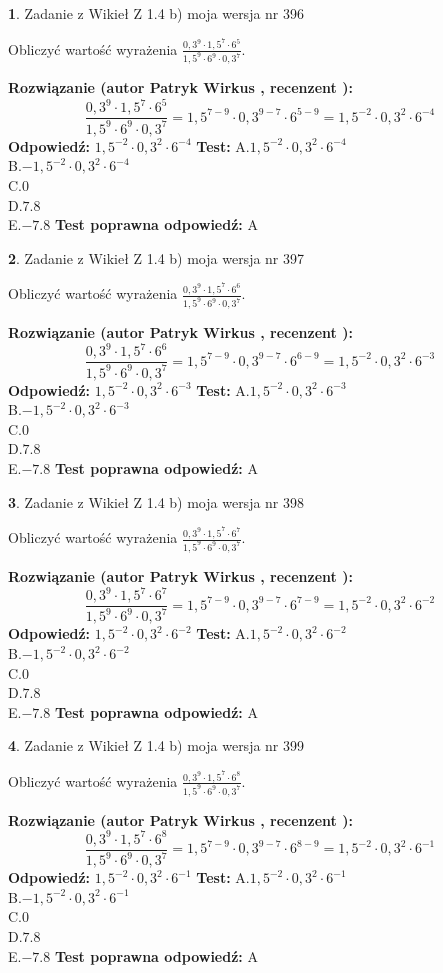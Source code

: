 \documentclass[12pt, a4paper]{article}
\theoremstyle{definition} %
\newtheorem{zad}{}
\newcommand{\zadStart}[1]{\begin{zad}#1\newline}
\newcommand{\zadStop}{\end{zad}}
\newcommand{\rozwStart}[2]{\noindent \textbf{Rozwiązanie (autor #1 , recenzent #2): }\newline}
\newcommand{\rozwStop}{\newline}
\newcommand{\odpStart}{\noindent \textbf{Odpowiedź:}\newline}
\newcommand{\odpStop}{\newline}
\newcommand{\testStart}{\noindent \textbf{Test:}\newline}
\newcommand{\testStop}{\newline}
\newcommand{\kluczStart}{\noindent \textbf{Test poprawna odpowiedź:}\newline}
\newcommand{\kluczStop}{\newline}
\begin{document}
\zadStart{Zadanie z Wikieł Z 1.4 b) moja wersja nr 396}

Obliczyć wartość wyrażenia $\frac{0,3^{9}\cdot1,5^{7}\cdot6^{5}}{1,5^{9}\cdot6^{9}\cdot0,3^{7}}$.
\zadStop
\rozwStart{Patryk Wirkus}{}
$$\frac{0,3^{9}\cdot1,5^{7}\cdot6^{5}}{1,5^{9}\cdot6^{9}\cdot0,3^{7}} = 1,5^{7-9} \cdot 0,3^{9-7} \cdot 6^{5-9} = 1,5^{-2} \cdot 0,3^{2} \cdot 6^{-4}$$
\rozwStop
\odpStart
$1,5^{-2} \cdot 0,3^{2} \cdot 6^{-4}$
\odpStop
\testStart
A.$1,5^{-2} \cdot 0,3^{2} \cdot 6^{-4}$\\ B.$-1,5^{-2} \cdot 0,3^{2} \cdot 6^{-4}$\\ C.$0$\\ D.$7.8$\\ E.$-7.8$
\testStop
\kluczStart
A
\kluczStop



\zadStart{Zadanie z Wikieł Z 1.4 b) moja wersja nr 397}

Obliczyć wartość wyrażenia $\frac{0,3^{9}\cdot1,5^{7}\cdot6^{6}}{1,5^{9}\cdot6^{9}\cdot0,3^{7}}$.
\zadStop
\rozwStart{Patryk Wirkus}{}
$$\frac{0,3^{9}\cdot1,5^{7}\cdot6^{6}}{1,5^{9}\cdot6^{9}\cdot0,3^{7}} = 1,5^{7-9} \cdot 0,3^{9-7} \cdot 6^{6-9} = 1,5^{-2} \cdot 0,3^{2} \cdot 6^{-3}$$
\rozwStop
\odpStart
$1,5^{-2} \cdot 0,3^{2} \cdot 6^{-3}$
\odpStop
\testStart
A.$1,5^{-2} \cdot 0,3^{2} \cdot 6^{-3}$\\ B.$-1,5^{-2} \cdot 0,3^{2} \cdot 6^{-3}$\\ C.$0$\\ D.$7.8$\\ E.$-7.8$
\testStop
\kluczStart
A
\kluczStop



\zadStart{Zadanie z Wikieł Z 1.4 b) moja wersja nr 398}

Obliczyć wartość wyrażenia $\frac{0,3^{9}\cdot1,5^{7}\cdot6^{7}}{1,5^{9}\cdot6^{9}\cdot0,3^{7}}$.
\zadStop
\rozwStart{Patryk Wirkus}{}
$$\frac{0,3^{9}\cdot1,5^{7}\cdot6^{7}}{1,5^{9}\cdot6^{9}\cdot0,3^{7}} = 1,5^{7-9} \cdot 0,3^{9-7} \cdot 6^{7-9} = 1,5^{-2} \cdot 0,3^{2} \cdot 6^{-2}$$
\rozwStop
\odpStart
$1,5^{-2} \cdot 0,3^{2} \cdot 6^{-2}$
\odpStop
\testStart
A.$1,5^{-2} \cdot 0,3^{2} \cdot 6^{-2}$\\ B.$-1,5^{-2} \cdot 0,3^{2} \cdot 6^{-2}$\\ C.$0$\\ D.$7.8$\\ E.$-7.8$
\testStop
\kluczStart
A
\kluczStop



\zadStart{Zadanie z Wikieł Z 1.4 b) moja wersja nr 399}

Obliczyć wartość wyrażenia $\frac{0,3^{9}\cdot1,5^{7}\cdot6^{8}}{1,5^{9}\cdot6^{9}\cdot0,3^{7}}$.
\zadStop
\rozwStart{Patryk Wirkus}{}
$$\frac{0,3^{9}\cdot1,5^{7}\cdot6^{8}}{1,5^{9}\cdot6^{9}\cdot0,3^{7}} = 1,5^{7-9} \cdot 0,3^{9-7} \cdot 6^{8-9} = 1,5^{-2} \cdot 0,3^{2} \cdot 6^{-1}$$
\rozwStop
\odpStart
$1,5^{-2} \cdot 0,3^{2} \cdot 6^{-1}$
\odpStop
\testStart
A.$1,5^{-2} \cdot 0,3^{2} \cdot 6^{-1}$\\ B.$-1,5^{-2} \cdot 0,3^{2} \cdot 6^{-1}$\\ C.$0$\\ D.$7.8$\\ E.$-7.8$
\testStop
\kluczStart
A
\kluczStop
\end{document}
